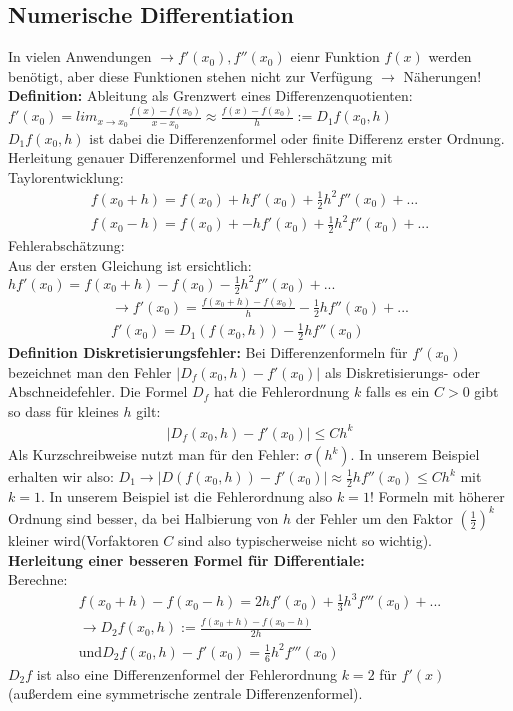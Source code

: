 \documentclass{scrartcl}
\begin{document}
\subsection{Numerische Differentiation}
In vielen Anwendungen $\rightarrow f'(x_0), f''(x_0)$ eienr Funktion $f(x)$ werden benötigt, aber diese Funktionen stehen nicht zur Verfügung $\rightarrow$ Näherungen!\\
\textbf{Definition:} Ableitung als Grenzwert eines Differenzenquotienten: $f'(x_0)= lim_{x \rightarrow x_0} \frac{f(x)-f(x_0) }{x-x_0} \approx \frac{f(x)-f(x_0) }{h}:= D_1 f(x_0,h)$\\
$D_1 f(x_0,h)$ ist dabei die Differenzenformel oder finite Differenz erster Ordnung.\\Herleitung genauer Differenzenformel und Fehlerschätzung mit Taylorentwicklung:
\begin{align}
f(x_0+h)=f(x_0)+ h f'(x_0)+ \frac{1}{2} h^2 f''(x_0)+...\\
f(x_0-h)=f(x_0)+ -h f'(x_0)+ \frac{1}{2} h^2 f''(x_0)+...
\end{align}
Fehlerabschätzung:\\
Aus der ersten Gleichung ist ersichtlich: $h f'(x_0)= f(x_0+h)-f(x_0)-\frac{1}{2} h^2 f''(x_0)+...$\\
\begin{align*}
\rightarrow f'(x_0)= \frac{f(x_0+h)-f(x_0)}{h}- \frac{1}{2} h f''(x_0)+... \\
f'(x_0)= D_1(f(x_0,h))- \frac{1}{2} h f''(x_0)
\end{align*}
\textbf{Definition Diskretisierungsfehler:} Bei Differenzenformeln für $f'(x_0)$ bezeichnet man den Fehler $|D_f(x_0,h)-f'(x_0)|$ als Diskretisierungs- oder Abschneidefehler. Die Formel $D_f$ hat die Fehlerordnung $k$ falls es ein $C>0$ gibt so dass für kleines $h$ gilt:
\begin{align*}
|D_f(x_0,h)-f'(x_0)| \leq C h^k
\end{align*}
Als Kurzschreibweise nutzt man für den Fehler: $\sigma(h^k)$.
In unserem Beispiel erhalten wir also: $D_1 \rightarrow |D(f(x_0,h))-f'(x_0)|\approx \frac{1}{2} h f''(x_0) \leq C h^k$ mit $k=1$.
In unserem Beispiel ist die Fehlerordnung also $k=1$! Formeln mit höherer Ordnung sind besser, da bei Halbierung von $h$ der Fehler um den Faktor $(\frac{1}{2})^k$ kleiner wird(Vorfaktoren $C$ sind also typischerweise nicht so wichtig).\\

\textbf{Herleitung einer besseren Formel für Differentiale:}\\
Berechne:
\begin{align*}
f(x_0+h)-f(x_0-h)= 2 h f'(x_0) +\frac{1}{3} h^3 f''' (x_0) + ... \\
\rightarrow D_2 f(x_0, h) := \frac{f(x_0+h)-f(x_0-h)}{2 h} \\
\text{und} D_2 f(x_0,h)-f'(x_0) = \frac{1}{6} h^2 f'''(x_0)
\end{align*}
$D_2 f$ ist also eine Differenzenformel der Fehlerordnung $k=2$ für $f'(x)$ (außerdem eine symmetrische zentrale Differenzenformel).
\end{document}
